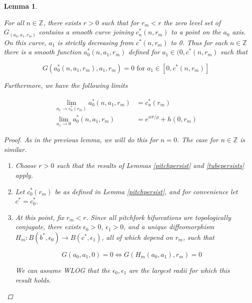 \documentclass[12pt]{article}
\def\Z{{\mathbb Z}}
\newtheorem{lemma}{Lemma}
\begin{document}
\begin{lemma}\label{lowerarmpersists}

For all $n \in \Z$, there exists $r > 0$ such that for $r_m < r$ the zero level set of $G_(a_0, a_1, r_m)$ contains a smooth curve joining $c_n^*(n, r_m)$ to a point on the $a_0$ axis. \\

On this curve, $a_1$ is strictly decreasing from $c^*(n, r_m)$ to 0. Thus for each $n \in \Z$ there is a smooth function $a_0^*(n, a_1, r_m)$ defined for $a_1 \in (0, c^*(n, r_m)$ such that 

\begin{equation}
G(a_0^*(n, a_1, r_m), a_1, r_m) = 0 \text{  for  }
a_1 \in [0, c^*(n, r_m)]
\end{equation}

Furthermore, we have the following limits

\begin{align*}
\lim_{a_1 \rightarrow c_n^*(r_m)} a_0^*(n, a_1, r_m) &= c_n^*(r_m) \\
\lim_{a_1 \rightarrow 0} a_0^*(n, a_1, r_m) &= e^{n \pi / \rho} + h(0, r_m)
\end{align*}

\begin{proof}
As in the previous lemma, we will do this for $n = 0$. The case for $n \in \Z$ is similar.\\

\begin{enumerate}

\item Choose $r > 0$ such that the results of Lemmas 
\ref{pitchpersist} and \ref{tubepersists} apply. 

\item Let $c_0^*(r_m)$ be as defined in Lemma \ref{pitchpersist}, and for convenience let $c^* = c_0^*$.

\item At this point, fix $r_m < r$. Since all pitchfork bifurcations are topologically conjugate, there exists $\epsilon_0 > 0$, $\epsilon_1 > 0$, and a unique diffeomorphism $H_m: B(b^*, \epsilon_0) \rightarrow B(c^*, \epsilon_1)$, all of which depend on $r_m$, such that

\begin{equation}
G(a_0, a_1, 0) = 0 \iff G(H_m(a_0, a_1), r_m) = 0
\end{equation}

We can assume WLOG that the $\epsilon_0, \epsilon_1$ are the largest radii for which this result holds.


\end{enumerate}
\end{proof}
\end{lemma}
\end{document}
